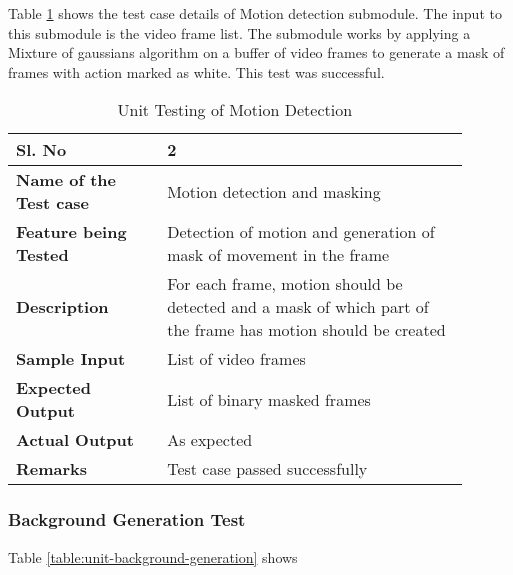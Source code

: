         Table \ref{table:unit-motion-detection} shows the test case details of Motion detection submodule. The input to this submodule is the video frame list. The submodule works by applying a Mixture of gaussians algorithm on a buffer of video frames to generate a mask of frames with action marked as white. This test was successful.

        \FloatBarrier
        \begin{table}[H]
            \begin{tabular}{|p{0.3\linewidth}|p{0.6\linewidth}|}
                \hline
                \textbf{Sl. No }              &\textbf{ 2}\\
                \hline
                \textbf{Name of the Test case}  & Motion detection and masking \\
                \hline
                \textbf{Feature being Tested}  & Detection of motion and generation of mask of movement in the frame \\
                \hline
                \textbf{Description}           & For each frame, motion should be detected and a mask of which part of the frame has motion should be created \\
                \hline
                \textbf{Sample Input}          & List of video frames \\
                \hline
                \textbf{Expected Output}       & List of binary masked frames \\
                \hline
                \textbf{Actual Output}         & As expected \\
                \hline
                \textbf{Remarks }              & Test case passed successfully \\
                \hline
            \end{tabular}
            \caption{Unit Testing of Motion Detection}
            \label{table:unit-motion-detection}
        \end{table}


        \subsubsection{Background Generation Test}

        Table \ref{table:unit-background-generation} shows

